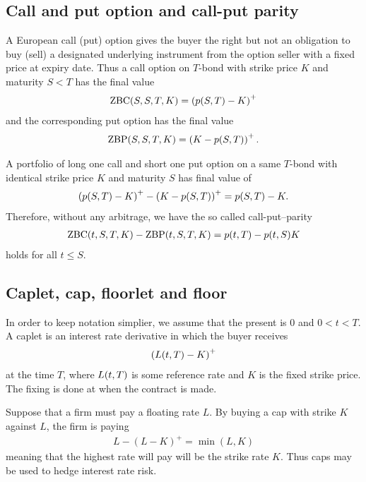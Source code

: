 \subsection{Call and put option and call-put parity}

A European call (put) option gives the buyer the right but not an obligation to buy (sell) a designated underlying instrument from the option seller with a fixed price at expiry date. Thus a call option on $T$-bond with strike price $K$ and maturity $S < T$ has the final value
	\begin{align}
		\operatorname{\mathrm{ZBC}}(S,S,T,K) = \left( p(S,T) - K \right)^+
	\end{align}
and the corresponding put option has the final value
	\begin{align}
		\operatorname{\mathrm{ZBP}}(S,S,T,K) = \left( K - p(S,T) \right)^+ .
	\end{align}
	
A portfolio of long one call and short one put option on a same $T$-bond with identical strike price $K$ and maturity $S$ has final value of
	\begin{align}
		\left( p(S,T) - K \right)^+ - \left( K - p(S,T) \right)^+ = p(S,T) - K.
	\end{align}
Therefore, without any arbitrage, we have the so called call-put--parity
	\begin{align}
		\operatorname{\mathrm{ZBC}}(t,S,T,K) - \operatorname{\mathrm{ZBP}}(t,S,T,K) = p(t,T) - p(t,S) K
	\end{align}
holds for all $t \leq S$.

	
\subsection{Caplet, cap, floorlet and floor}

In order to keep notation simplier, we assume that the present is $0$ and $0 < t < T$. A caplet is an interest rate derivative in which the buyer receives
	\begin{align}
		\left( L(t,T) - K \right)^+
	\end{align}
at the time $T$, where $L(t,T)$ is some reference rate and $K$ is the fixed strike price. The fixing is done at when the contract is made. 

Suppose that a firm must pay a floating rate $L$. By buying a cap with strike $K$ against $L$, the firm is paying
	\begin{align}
		L - \left( L - K \right)^+  = \min (L,K)
	\end{align}
meaning that the highest rate will pay will be the strike rate $K$. Thus caps may be used to hedge interest rate risk.

